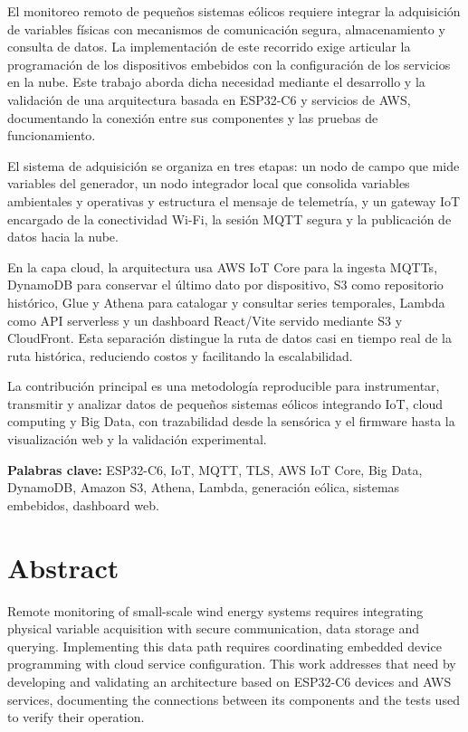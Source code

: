 El monitoreo remoto de pequeños sistemas eólicos requiere integrar la adquisición de variables físicas con mecanismos de comunicación segura, almacenamiento y consulta de datos. La implementación de este recorrido exige articular la programación de los dispositivos embebidos con la configuración de los servicios en la nube. Este trabajo aborda dicha necesidad mediante el desarrollo y la validación de una arquitectura basada en ESP32-C6 y servicios de AWS, documentando la conexión entre sus componentes y las pruebas de funcionamiento.

El sistema de adquisición se organiza en tres etapas: un nodo de campo que mide variables del generador, un nodo integrador local que consolida variables ambientales y operativas y estructura el mensaje de telemetría, y un gateway IoT encargado de la conectividad Wi-Fi, la sesión MQTT segura y la publicación de datos hacia la nube.

En la capa cloud, la arquitectura usa AWS IoT Core para la ingesta MQTTs, DynamoDB para conservar el último dato por dispositivo, S3 como repositorio histórico, Glue y Athena para catalogar y consultar series temporales, Lambda como API serverless y un dashboard React/Vite servido mediante S3 y CloudFront. Esta separación distingue la ruta de datos casi en tiempo real de la ruta histórica, reduciendo costos y facilitando la escalabilidad.

La contribución principal es una metodología reproducible para instrumentar, transmitir y analizar datos de pequeños sistemas eólicos integrando IoT, cloud computing y Big Data, con trazabilidad desde la sensórica y el firmware hasta la visualización web y la validación experimental.

\vspace{0.5cm}

\noindent
\textbf{Palabras clave:} ESP32-C6, IoT, MQTT, TLS, AWS IoT Core, Big Data, DynamoDB, Amazon S3, Athena, Lambda, generación eólica, sistemas embebidos, dashboard web.


\cleardoublepage
\chapter*{Abstract}

Remote monitoring of small-scale wind energy systems requires integrating physical variable acquisition with secure communication, data storage and querying. Implementing this data path requires coordinating embedded device programming with cloud service configuration. This work addresses that need by developing and validating an architecture based on ESP32-C6 devices and AWS services, documenting the connections between its components and the tests used to verify their operation.

